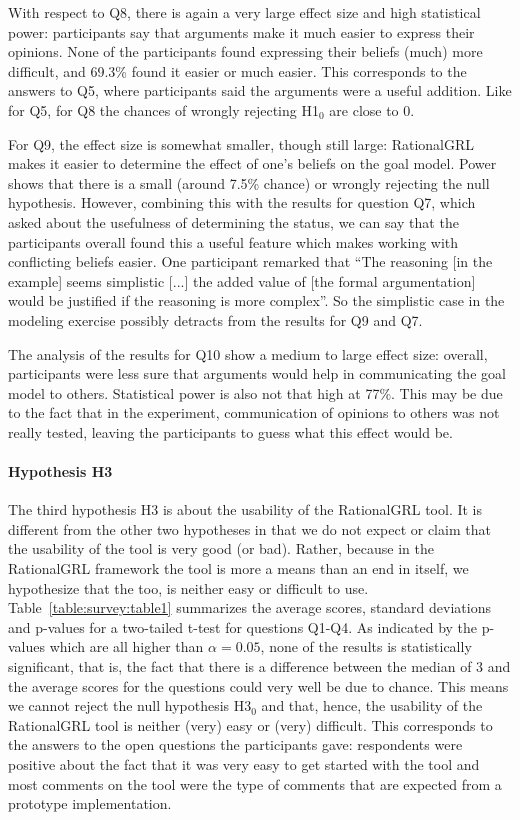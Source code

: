 With respect to Q8, there is again a very large effect size and high statistical power: participants say that arguments make it much easier to express their opinions. None of the participants found expressing their beliefs (much) more difficult, and 69.3\% found it easier or much easier. This corresponds to the answers to Q5, where participants said the arguments were a useful addition. Like for Q5, for Q8 the chances of wrongly rejecting H1$_{0}$ are close to 0. 

For Q9, the effect size is somewhat smaller, though still large: RationalGRL makes it easier to determine the effect of one's beliefs on the goal model. Power shows that there is a small (around 7.5\% chance) or wrongly rejecting the null hypothesis. However, combining this with the results for question Q7, which asked about the usefulness of determining the status, we can say that the participants overall found this a useful feature which makes working with conflicting beliefs easier. One participant remarked that ``The reasoning [in the example] seems simplistic [...] the added value of [the formal argumentation] would be justified if the reasoning is more complex''. So the simplistic case in the modeling exercise possibly detracts from the results for Q9 and Q7.

The analysis of the results for Q10 show a medium to large effect size: overall, participants were less sure that arguments would help in communicating the goal model to others. Statistical power is also not that high at 77\%. This may be due to the fact that in the experiment, communication of opinions to others was not really tested, leaving the participants to guess what this effect would be.  

\paragraph{Hypothesis H3}
The third hypothesis H3 is about the usability of the RationalGRL tool. It is different from the other two hypotheses in that we do not expect or claim that the usability of the tool is very good (or bad). Rather, because in the RationalGRL framework the tool is more a means than an end in itself, we hypothesize that the too, is neither easy or difficult to use. Table~\ref{table:survey:table1} summarizes the average scores, standard deviations and p-values for a two-tailed t-test for questions Q1-Q4. As indicated by the p-values which are all higher than $\alpha=0.05$, none of the results is statistically significant, that is, the fact that there is a difference between the median of 3 and the average scores for the questions could very well be due to chance. This means we cannot reject the null hypothesis H3$_{0}$ and that, hence, the usability of the RationalGRL tool is neither (very) easy or (very) difficult. This corresponds to the answers to the open questions the participants gave: respondents were positive about the fact that it was very easy to get started with the tool and most comments on the tool were the type of comments that are expected from a prototype implementation. 

